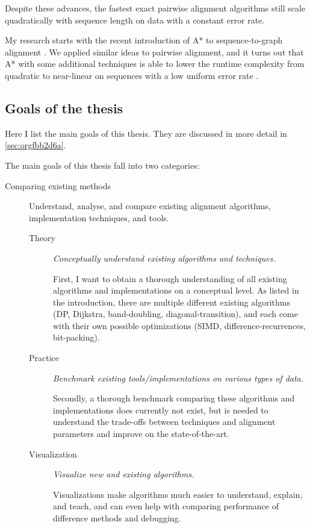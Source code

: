 \documentclass[11pt,english,a4paper]{article}
\begin{document}
Despite these advances, the fastest exact pairwise alignment algorithms still
scale quadratically with sequence length on data with a constant error rate.

My research starts with the recent introduction of A* to sequence-to-graph
alignment \autocites{astarix-2}[][]{astarix-1}. We applied similar ideas to pairwise
alignment, and it turns out that A* with some additional techniques is able to
lower the runtime complexity from quadratic to near-linear on sequences with a
low uniform error rate \autocite{astarpa}.

\subsection{Goals of the thesis}
\label{sec:orgc25a27e}
Here I list the main goals of this thesis. They are discussed in more detail in
\ref{sec:orgfbb2d6a}.

The main goals of this thesis fall into two categories:
\begin{description}
\item[{Comparing existing methods}] Understand, analyse, and compare existing
alignment algorithms, implementation techniques, and tools.
\begin{description}
\item[{Theory}] \emph{Conceptually understand existing algorithms and techniques.}

First, I want to obtain a thorough understanding of all existing algorithms and
implementations on a conceptual level.
As listed in the introduction, there are multiple different existing algorithms
(DP, Dijkstra, band-doubling, diagonal-transition), and each come with their own
possible optimizations (SIMD, difference-recurrences, bit-packing).
\item[{Practice}] \emph{Benchmark existing tools/implementations on various types of data.}

Secondly, a thorough benchmark comparing these algorithms and implementations
does currently not exist, but is needed to understand the trade-offs between
techniques and alignment parameters and improve on the state-of-the-art.
\item[{Visualization}] \emph{Visualize new and existing algorithms.}

Visualizations make algorithms much easier to understand, explain, and teach, and
can even help with comparing performance of difference methods and debugging.
\end{description}
\end{description}
\end{document}
